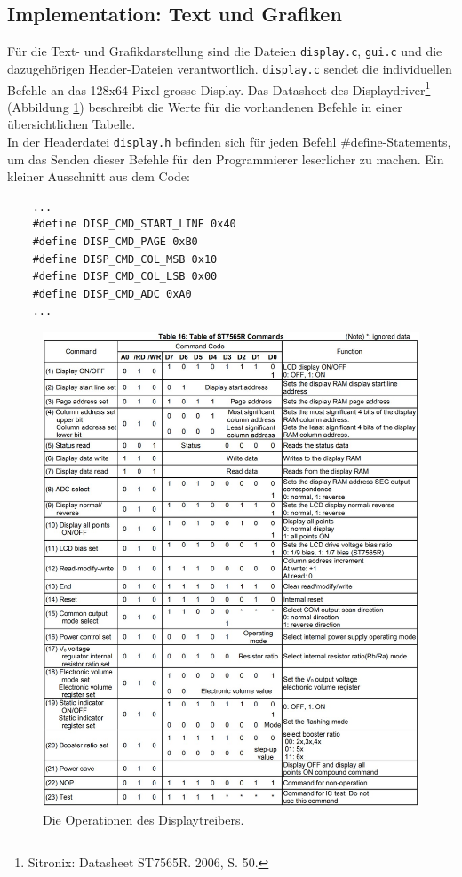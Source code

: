 \documentclass[12pt, a4paper]{report}
\begin{document}
\subsection{Implementation: Text und Grafiken}
Für die Text- und Grafikdarstellung sind die Dateien \texttt{display.c}, \texttt{gui.c} und die dazugehörigen Header-Dateien verantwortlich. \texttt{display.c} sendet die individuellen Befehle an das 128x64 Pixel grosse Display. Das Datasheet des Displaydriver\footnote{Sitronix: Datasheet ST7565R. 2006, S. 50.} (Abbildung \ref{fig:st7565r_ops}) beschreibt die Werte für die vorhandenen Befehle in einer übersichtlichen Tabelle.
\\[\medskipamount]
In der Headerdatei \texttt{display.h} befinden sich für jeden Befehl \textsf{\#define}-Statements, um das Senden dieser Befehle für den Programmierer leserlicher zu machen. Ein kleiner Ausschnitt aus dem Code:
\begin{verbatim}
	...
	#define DISP_CMD_START_LINE 0x40
	#define DISP_CMD_PAGE 0xB0
	#define DISP_CMD_COL_MSB 0x10
	#define DISP_CMD_COL_LSB 0x00
	#define DISP_CMD_ADC 0xA0
	...
\end{verbatim}
\newpage
\begin{figure}[H]
	\centering
	\includegraphics[width=\linewidth]{assets/st7565r_ops.jpg}
	\caption{Die Operationen des Displaytreibers.}
	\label{fig:st7565r_ops}
\end{figure}
\end{document}

